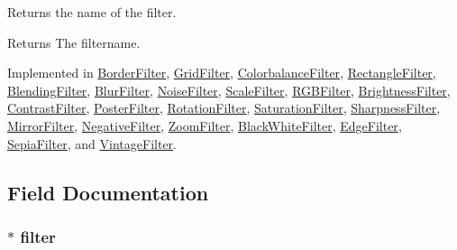 Returns the name of the filter. 

\begin{DoxyReturn}{Returns}
The filtername.
\end{DoxyReturn}


Implemented in \hyperlink{classModel_1_1BorderFilter_a11335e13e50af74108bf926dc1340b4b}{Border\+Filter}, \hyperlink{classModel_1_1GridFilter_a11335e13e50af74108bf926dc1340b4b}{Grid\+Filter}, \hyperlink{classModel_1_1ColorbalanceFilter_a11335e13e50af74108bf926dc1340b4b}{Colorbalance\+Filter}, \hyperlink{classModel_1_1RectangleFilter_a11335e13e50af74108bf926dc1340b4b}{Rectangle\+Filter}, \hyperlink{classModel_1_1BlendingFilter_a11335e13e50af74108bf926dc1340b4b}{Blending\+Filter}, \hyperlink{classModel_1_1BlurFilter_a11335e13e50af74108bf926dc1340b4b}{Blur\+Filter}, \hyperlink{classModel_1_1NoiseFilter_a11335e13e50af74108bf926dc1340b4b}{Noise\+Filter}, \hyperlink{classModel_1_1ScaleFilter_a11335e13e50af74108bf926dc1340b4b}{Scale\+Filter}, \hyperlink{classModel_1_1RGBFilter_a11335e13e50af74108bf926dc1340b4b}{R\+G\+B\+Filter}, \hyperlink{classModel_1_1BrightnessFilter_a11335e13e50af74108bf926dc1340b4b}{Brightness\+Filter}, \hyperlink{classModel_1_1ContrastFilter_a11335e13e50af74108bf926dc1340b4b}{Contrast\+Filter}, \hyperlink{classModel_1_1PosterFilter_a11335e13e50af74108bf926dc1340b4b}{Poster\+Filter}, \hyperlink{classModel_1_1RotationFilter_a11335e13e50af74108bf926dc1340b4b}{Rotation\+Filter}, \hyperlink{classModel_1_1SaturationFilter_a11335e13e50af74108bf926dc1340b4b}{Saturation\+Filter}, \hyperlink{classModel_1_1SharpnessFilter_a11335e13e50af74108bf926dc1340b4b}{Sharpness\+Filter}, \hyperlink{classModel_1_1MirrorFilter_a11335e13e50af74108bf926dc1340b4b}{Mirror\+Filter}, \hyperlink{classModel_1_1NegativeFilter_a11335e13e50af74108bf926dc1340b4b}{Negative\+Filter}, \hyperlink{classModel_1_1ZoomFilter_a11335e13e50af74108bf926dc1340b4b}{Zoom\+Filter}, \hyperlink{classModel_1_1BlackWhiteFilter_a11335e13e50af74108bf926dc1340b4b}{Black\+White\+Filter}, \hyperlink{classModel_1_1EdgeFilter_a11335e13e50af74108bf926dc1340b4b}{Edge\+Filter}, \hyperlink{classModel_1_1SepiaFilter_a11335e13e50af74108bf926dc1340b4b}{Sepia\+Filter}, and \hyperlink{classModel_1_1VintageFilter_a11335e13e50af74108bf926dc1340b4b}{Vintage\+Filter}.



\subsection{Field Documentation}
\hypertarget{classModel_1_1Filter_a380b5b271af99af20b25c1419b390130}{}
\subsubsection[{filter}]{$\ast$ filter}\label{classModel_1_1Filter_a380b5b271af99af20b25c1419b390130}
